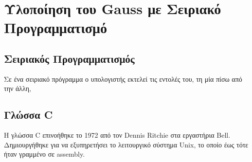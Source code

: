 \section{Υλοποίηση του \lt Gauss με Σειριακό Προγραμματισμό}

\subsection{Σειριακός Προγραμματισμός}    
Σε ένα σειριακό πρόγραμμα ο υπολογιστής εκτελεί τις εντολές του, τη μία πίσω από την άλλη, 
    
   
\subsection{Γλώσσα {\lt C}}
    
Η γλώσσα {\lt C} επινοήθηκε το 1972 από τον {\lt Dennis Ritchie} στα εργαστήρια {\lt Bell}. Δημιουργήθηκε για να εξυπηρετήσει το λειτουργικό σύστημα {\lt Unix}, το οποίο έως τότε ήταν γραμμένο σε {\lt assembly}. \cite{GlwssaC}
